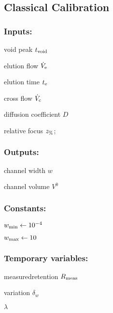 \subsection*{Classical Calibration}

\subsubsection*{Inputs:}
\begin{multicols}{3}
  \begin{packed_item}
  \item void peak $t_\text{void}$
  \item elution flow $\dot{V}_\text{e}$
  \item elution time $t_\text{e}$
  \item cross flow $\dot{V}_\text{c}$
  \item \small diffusion coefficient \normalsize $D$
  \item relative focus $z_\text{\%}$;
  \end{packed_item}
\end{multicols}

\subsubsection*{Outputs:}
\begin{multicols}{3}
  \begin{packed_item}
  \item channel width $w$
  \item channel volume $V^0$
  \end{packed_item}
\end{multicols}

\subsubsection*{Constants:}
\begin{multicols}{3}
  \begin{packed_item}
    \item $w_\text{min} \leftarrow 10^{-4}$
    \item  $w_\text{max} \leftarrow 10$
  \end{packed_item}
\end{multicols}

\subsubsection*{Temporary variables:}
\begin{multicols}{3}
  \begin{packed_item}
  \item measured\enspace retention $R_\text{meas}$
  \item variation $δ_w$
  \item $\lambda$
  \end{packed_item}
\end{multicols}
\clearpage
